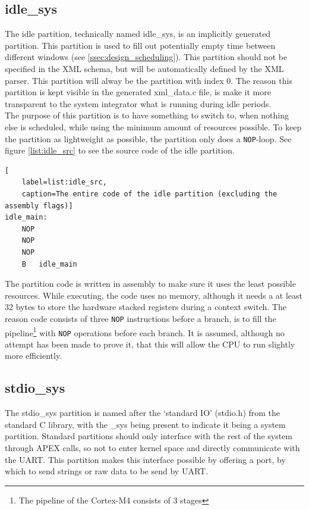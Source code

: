 \subsection{idle\_sys}
\label{ssec:idle_part}
The idle partition, technically named idle\_sys, is an implicitly generated
partition. This partition is used to fill out potentially empty time between
different windows (see \ref{ssec:design_scheduling}). This partition should not
be specified in the XML schema, but will be automatically defined by the XML
parser. This partition will alway be the partition with index 0. The reason this
partition is kept visible in the generated xml\_data.c file, is make it more
transparent to the system integrator what is running during idle periods.\\

The purpose of this partition is to have something to switch to, when nothing
else is scheduled, while using the minimum amount of resources possible.
To keep the partition as lightweight as possible, the partition only does a
\texttt{NOP}-loop. See figure \ref{list:idle_src} to see the source code of the
idle partition.\\

\begin{minipage}{\linewidth}
\begin {lstlisting}[
	label=list:idle_src,
	caption=The entire code of the idle partition (excluding the assembly flags)]
idle_main:
	NOP
	NOP
	NOP
	B   idle_main
\end{lstlisting}
\end{minipage}

The partition code is written in assembly to make sure it uses the least possible
resources. While executing, the code uses no memory, although it needs a at
least 32 bytes to store the hardware stacked registers during a context switch.
The reason code consists of three \texttt{NOP} instructions before a branch, is
to fill the pipeline\footnote{The pipeline of the Cortex-M4 consists of 3 stages}
with \texttt{NOP} operations before each branch. It is assumed, although no
attempt has been made to prove it, that this will allow the CPU to run slightly
more efficiently.

\subsection{stdio\_sys}
\label{impl:stdio_sys}
The stdio\_sys partition is named after the `standard IO' (stdio.h) from the
standard C library, with the \_sys being present to indicate it being a system
partition. Standard partitions should only interface with the rest of the system
through APEX calls, so not to enter kernel space and directly communicate with
the UART. This partition makes this interface possible by offering a port, by
which to send strings or raw data to be send by UART.\\

